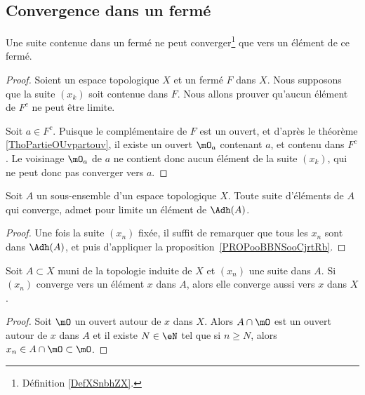 \subsection{Convergence dans un fermé}

\begin{proposition}      \label{PROPooBBNSooCjrtRb}
	Une suite contenue dans un fermé ne peut converger\footnote{Définition \ref{DefXSnbhZX}.} que vers un élément de ce fermé.
\end{proposition}

\begin{proof}
	Soient un espace topologique \( X\) et un fermé \( F\) dans \( X\). Nous supposons que la suite \( (x_k)\) soit contenue dans \( F\). Nous allons prouver qu'aucun élément de \( F^c\) ne peut être limite.

	Soit \( a \in F^c\). Puisque le complémentaire de \( F\) est un ouvert, et d'après le théorème \ref{ThoPartieOUvpartouv}, il existe un ouvert \( \mO_a\) contenant \( a\), et contenu dans \( F^c\). Le voisinage \( \mO_a\) de \( a\) ne contient donc aucun élément de la suite \( (x_k)\), qui ne peut donc pas converger vers \( a\).
\end{proof}

\begin{corollary}\label{CorLimAbarA}
	Soit \( A \) un sous-ensemble d'un espace topologique \( X\). Toute suite d'éléments de \( A\) qui converge, admet pour limite un élément de \( \Adh(A) \).
\end{corollary}
\begin{proof}
	Une fois la suite \( (x_n) \) fixée, il suffit de remarquer que tous les \( x_n \) sont dans \( \Adh(A) \), et puis d'appliquer la proposition~\ref{PROPooBBNSooCjrtRb}.
\end{proof}


\begin{lemma}   \label{LemPESaiVw}
	Soit \( A\subset X\) muni de la topologie induite de \( X\) et \( (x_n)\) une suite dans \( A\). Si \( (x_n) \) converge vers un élément \( x \) dans \(A \), alors elle converge aussi vers \(x \) dans \( X \).
\end{lemma}

\begin{proof}
	Soit \( \mO\) un ouvert autour de \( x\) dans \( X\). Alors \( A\cap\mO\) est un ouvert autour de \( x\) dans \( A\) et il existe \( N\in \eN\) tel que si \( n\geq N\), alors \( x_n\in A\cap\mO\subset\mO\).
\end{proof}

